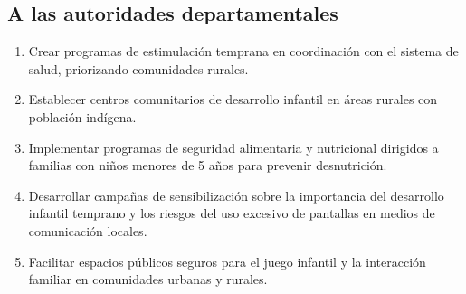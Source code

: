 \documentclass[11pt,letterpaper]{report}
\begin{document}
\subsection*{A las autoridades departamentales}
\begin{enumerate}
\item Crear programas de estimulación temprana en coordinación 
con el sistema de salud, priorizando comunidades rurales.

\item Establecer centros comunitarios de desarrollo infantil en áreas 
rurales con población indígena.

\item Implementar programas de seguridad alimentaria y nutricional 
dirigidos a familias con niños menores de 5 años para prevenir 
desnutrición.

\item Desarrollar campañas de sensibilización sobre la importancia del 
desarrollo infantil temprano y los riesgos del uso excesivo de pantallas 
en medios de comunicación locales.

\item Facilitar espacios públicos seguros para el juego infantil y la 
interacción familiar en comunidades urbanas y rurales.
\end{enumerate}

\newpage
\end{document}
